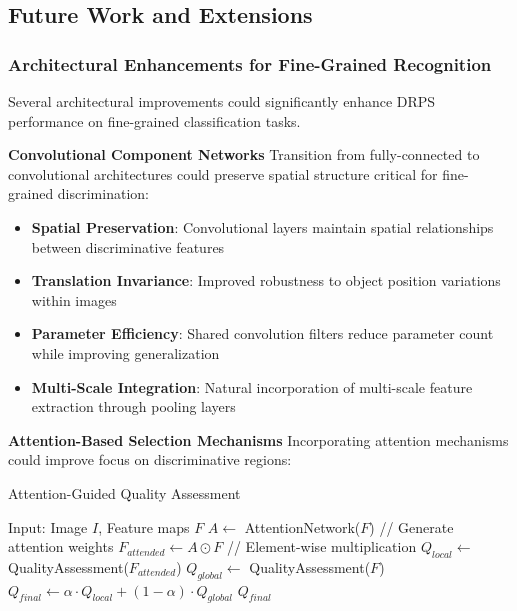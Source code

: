 \documentclass[12pt]{article}
\begin{document}
\subsection{Future Work and Extensions}\label{future-work}

\subsubsection{Architectural Enhancements for Fine-Grained Recognition}\label{architectural-future}

Several architectural improvements could significantly enhance DRPS performance on fine-grained classification tasks.

\textbf{Convolutional Component Networks}
Transition from fully-connected to convolutional architectures could preserve spatial structure critical for fine-grained discrimination:

\begin{itemize}
\item \textbf{Spatial Preservation}: Convolutional layers maintain spatial relationships between discriminative features
\item \textbf{Translation Invariance}: Improved robustness to object position variations within images
\item \textbf{Parameter Efficiency}: Shared convolution filters reduce parameter count while improving generalization
\item \textbf{Multi-Scale Integration}: Natural incorporation of multi-scale feature extraction through pooling layers
\end{itemize}

\textbf{Attention-Based Selection Mechanisms}
Incorporating attention mechanisms could improve focus on discriminative regions:

\begin{algorithm}
\caption{Attention-Guided Quality Assessment}
\begin{algorithmic}
\STATE Input: Image $I$, Feature maps $F$
\STATE $A \leftarrow$ AttentionNetwork($F$) // Generate attention weights
\STATE $F_{attended} \leftarrow A \odot F$ // Element-wise multiplication
\STATE $Q_{local} \leftarrow$ QualityAssessment($F_{attended}$)
\STATE $Q_{global} \leftarrow$ QualityAssessment($F$)
\STATE $Q_{final} \leftarrow \alpha \cdot Q_{local} + (1-\alpha) \cdot Q_{global}$
\RETURN $Q_{final}$
\end{algorithmic}
\end{algorithm}
\end{document}

